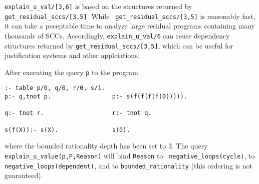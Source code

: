 \begin{description}
{\tt explain\_u\_val/[3,6]} is based on the structures returned by
{\tt get\_residual\_sccs/[3,5]}.  While {\tt
  get\_residual\_sccs/[3,5]} is reasonably fast, it can take a
peceptable time to analyze large residual programs containing many
thousands of SCCs.  Accordingly, {\tt explain\_u\_val/6} can reuse
dependency structures returned by {\tt get\_residual\_sccs/[3,5]},
which can be useful for justification systems and other applciations.

\begin{example} \rm
After executing the query {\tt p} to the program
%
\begin{verbatim}
:- table p/0, q/0, r/0, s/1.
p:- q,tnot p.                 p:- s(f(f(f(f(0))))).

q:- tnot r.                   r:- tnot q.

s(f(X)):- s(X).               s(0).
\end{verbatim}
%
where the bounded rationality depth has been set to 3.  The query {\tt
  explain\_u\_value(p,P,Reason)} will bind {\tt Reason} to {\tt
  negative\_loops(cycle)}, to {\tt negative\_loops(dependent)}, and
to {\tt bounded\_rationality} (this ordering is not guaranteed).
\end{example}





\end{description}
